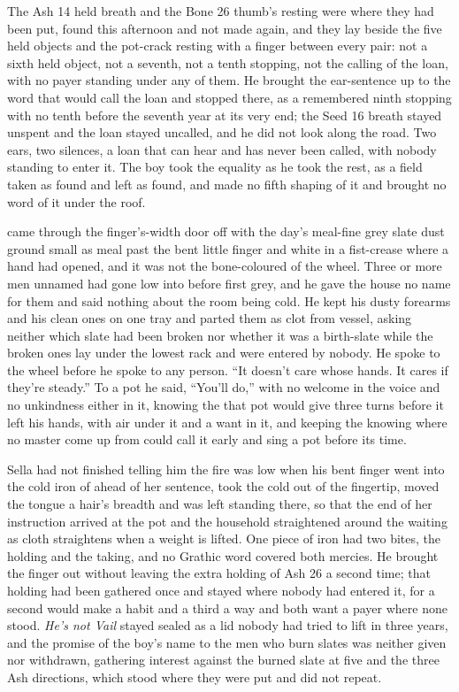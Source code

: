 The Ash 14 held breath and the Bone 26 thumb's resting were where they had been put, found this afternoon and not made again, and they lay beside the five held objects and the pot-crack resting with a finger between every pair: not a sixth held object, not a seventh, not a tenth stopping, not the calling of the loan, with no payer standing under any of them. He brought the ear-sentence up to the word that would call the loan and stopped there, as a remembered ninth stopping with no tenth before the seventh year at its very end; the Seed 16 breath stayed unspent and the loan stayed uncalled, and he did not look along the road. Two ears, two silences, a loan that can hear and has never been called, with nobody standing to enter it. The boy took the equality as he took the rest, as a field taken as found and left as found, and made no fifth shaping of it and brought no word of it under the roof.

 came through the finger's-width door off  with the day's meal-fine grey slate dust ground small as meal past the bent little finger and white in a fist-crease where a hand had opened, and it was not the bone-coloured  of the wheel. Three or more men unnamed had gone low into  before first grey, and he gave the house no name for them and said nothing about the room being cold. He kept his dusty forearms and his clean ones on one tray and parted them as clot from vessel, asking neither which slate had been broken nor whether it was a birth-slate while the broken ones lay under the lowest rack and were entered by nobody. He spoke to the wheel before he spoke to any person. “It doesn't care whose hands. It cares if they're steady.” To a pot he said, “You'll do,” with no welcome in the voice and no unkindness either in it, knowing the  that pot would give three turns before it left his hands, with air under it and a want in it, and keeping the knowing where no master come up from  could call it early and sing a pot before its time.

Sella had not finished telling him the fire was low when his bent finger went into the cold iron of  ahead of her sentence, took the cold out of the fingertip, moved the tongue a hair's breadth and was left standing there, so that the end of her instruction arrived at the pot and the household straightened around the waiting as cloth straightens when a weight is lifted. One piece of iron had two bites, the holding and the taking, and no Grathic word covered both mercies. He brought the finger out without leaving the extra holding of Ash 26 a second time; that holding had been gathered once and stayed where nobody had entered it, for a second would make a habit and a third a way and both want a payer where none stood. \emph{He's not Vail} stayed sealed as a lid nobody had tried to lift in three years, and the promise of the boy's name to the men who burn slates was neither given nor withdrawn, gathering interest against the burned slate at five and the three Ash directions, which stood where they were put and did not repeat.

